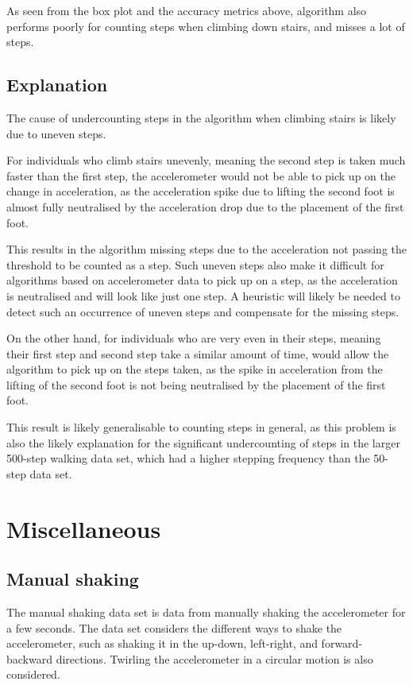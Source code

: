 \documentclass[12pt]{report}
\begin{document}
As seen from the box plot and the accuracy metrics above,
algorithm also performs poorly for counting steps when
climbing down stairs, and misses a lot of steps.
\subsection{Explanation}
\label{sec:orgd49675c}
The cause of undercounting steps in the algorithm
when climbing stairs is likely due to uneven steps.

For individuals who climb stairs unevenly, meaning the second step
is taken much faster than the first step, the accelerometer would not
be able to pick up on the change in acceleration, as the acceleration
spike due to lifting the second foot is almost fully neutralised
by the acceleration drop due to the placement of the first foot.

This results in the algorithm missing steps due to the acceleration
not passing the threshold to be counted as a step. Such uneven steps
also make it difficult for algorithms based on accelerometer data to
pick up on a step, as the acceleration is neutralised and will look
like just one step. A heuristic will likely be needed to detect such
an occurrence of uneven steps and compensate for the missing steps.

On the other hand, for individuals who are very even in their steps,
meaning their first step and second step take a similar
amount of time, would allow the algorithm to pick up on the
steps taken, as the spike in acceleration from the lifting of the
second foot is not being neutralised by the placement of the
first foot.

This result is likely generalisable to counting steps in general,
as this problem is also the likely explanation for the significant
undercounting of steps in the larger 500-step walking data set,
which had a higher stepping frequency than the 50-step data set.
\section{Miscellaneous}
\label{sec:org255c409}

\subsection{Manual shaking}
\label{sec:orgd0ed701}
The manual shaking data set is data from manually shaking the
accelerometer for a few seconds. The data set considers the
different ways to shake the accelerometer, such as shaking it
in the up-down, left-right, and forward-backward directions.
Twirling the accelerometer in a circular motion is also considered.
\end{document}
